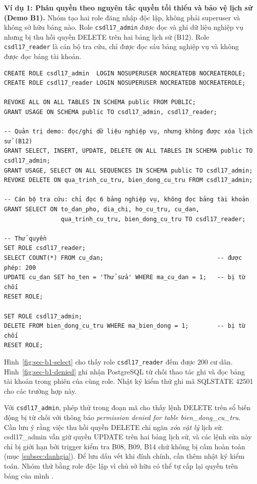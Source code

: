 \textbf{Ví dụ 1: Phân quyền theo nguyên tắc quyền tối thiểu và bảo vệ lịch sử (Demo B1).} Nhóm tạo hai role đăng nhập độc lập, không phải superuser và không sở hữu bảng nào. Role \texttt{csdl17\_admin} được đọc và ghi dữ liệu nghiệp vụ nhưng bị thu hồi quyền DELETE trên hai bảng lịch sử (B12). Role \texttt{csdl17\_reader} là cán bộ tra cứu, chỉ được đọc sáu bảng nghiệp vụ và không được đọc bảng tài khoản.

\begin{lstlisting}[style=sqlvn]
CREATE ROLE csdl17_admin  LOGIN NOSUPERUSER NOCREATEDB NOCREATEROLE;
CREATE ROLE csdl17_reader LOGIN NOSUPERUSER NOCREATEDB NOCREATEROLE;

REVOKE ALL ON ALL TABLES IN SCHEMA public FROM PUBLIC;
GRANT USAGE ON SCHEMA public TO csdl17_admin, csdl17_reader;

-- Quản trị demo: đọc/ghi dữ liệu nghiệp vụ, nhưng không được xóa lịch sử (B12)
GRANT SELECT, INSERT, UPDATE, DELETE ON ALL TABLES IN SCHEMA public TO csdl17_admin;
GRANT USAGE, SELECT ON ALL SEQUENCES IN SCHEMA public TO csdl17_admin;
REVOKE DELETE ON qua_trinh_cu_tru, bien_dong_cu_tru FROM csdl17_admin;

-- Cán bộ tra cứu: chỉ đọc 6 bảng nghiệp vụ, không đọc bảng tài khoản
GRANT SELECT ON to_dan_pho, dia_chi, ho_cu_tru, cu_dan,
                qua_trinh_cu_tru, bien_dong_cu_tru TO csdl17_reader;

-- Thử quyền
SET ROLE csdl17_reader;
SELECT COUNT(*) FROM cu_dan;                                -- được phép: 200
UPDATE cu_dan SET ho_ten = 'Thử sửa' WHERE ma_cu_dan = 1;   -- bị từ chối
RESET ROLE;

SET ROLE csdl17_admin;
DELETE FROM bien_dong_cu_tru WHERE ma_bien_dong = 1;        -- bị từ chối
RESET ROLE;
\end{lstlisting}

Hình~\ref{fig:sec-b1-select} cho thấy role \texttt{csdl17\_reader} đếm được 200 cư dân. Hình~\ref{fig:sec-b1-denied} ghi nhận PostgreSQL từ chối thao tác ghi và đọc bảng tài khoản trong phiên của cùng role. Nhật ký kiểm thử ghi mã SQLSTATE 42501 cho các trường hợp này.

Với \texttt{csdl17\_admin}, phép thử trong đoạn mã cho thấy lệnh DELETE trên sổ biến động bị từ chối với thông báo \textit{permission denied for table bien\_dong\_cu\_tru}. Cần lưu ý rằng việc thu hồi quyền DELETE chỉ ngăn \emph{xóa vật lý} lịch sử: csdl17\_admin vẫn giữ quyền UPDATE trên hai bảng lịch sử, và các lệnh sửa này chỉ bị giới hạn bởi trigger kiểm tra B08, B09, B14 chứ không bị cấm hoàn toàn (mục \ref{subsec:danhgia}). Để lưu dấu vết khi đính chính, cần thêm nhật ký kiểm toán. Nhóm thử bằng role độc lập vì chủ sở hữu có thể tự cấp lại quyền trên bảng của mình \cite{postgres}.

